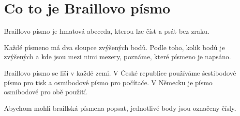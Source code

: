 \section{Co to je Braillovo písmo}

Braillovo písmo je hmatová abeceda, kterou lze číst a psát bez zraku.

Každé písmeno má dva sloupce zvýšených bodů. Podle toho, kolik bodů je zvýšených a kde jsou mezi nimi mezery, poznáme, které písmeno je napsáno.

Braillovo písmo se liší v každé zemi.  V České republice používáme šestibodové písmo pro tisk a osmibodové písmo pro počítače.  V Německu je písmo osmibodové pro obě použití.

Abychom mohli braillská písmena popsat, jednotlivé body jsou označeny čísly.


